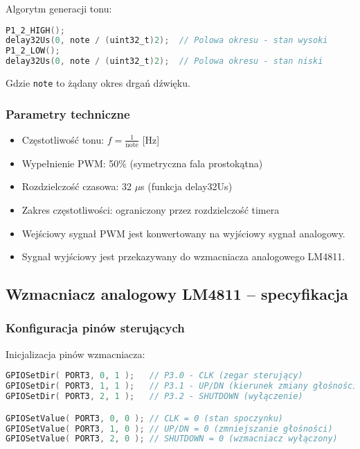 \documentclass[a4paper,12pt]{report}
\begin{document}
Algorytm generacji tonu:

\begin{lstlisting}[language=C]
P1_2_HIGH();
delay32Us(0, note / (uint32_t)2);  // Polowa okresu - stan wysoki
P1_2_LOW();
delay32Us(0, note / (uint32_t)2);  // Polowa okresu - stan niski
\end{lstlisting}

Gdzie \texttt{note} to żądany okres drgań dźwięku.

\subsubsection{Parametry techniczne}

\begin{itemize}
    \item Częstotliwość tonu: $f = \frac{1}{\text{note}}$ [Hz]
    \item Wypełnienie PWM: 50\% (symetryczna fala prostokątna)
    \item Rozdzielczość czasowa: 32 $\mu$s (funkcja delay32Us)
    \item Zakres częstotliwości: ograniczony przez rozdzielczość timera
\end{itemize}

\begin{itemize}
    \item Wejściowy sygnał PWM jest konwertowany na wyjściowy sygnał analogowy.
    \item Sygnał wyjściowy jest przekazywany do wzmacniacza analogowego LM4811.
\end{itemize}

\subsection{Wzmacniacz analogowy LM4811 -- specyfikacja}

\subsubsection{Konfiguracja pinów sterujących}

Inicjalizacja pinów wzmacniacza:
\begin{lstlisting}[language=C]
GPIOSetDir( PORT3, 0, 1 );   // P3.0 - CLK (zegar sterujący)
GPIOSetDir( PORT3, 1, 1 );   // P3.1 - UP/DN (kierunek zmiany głośności)
GPIOSetDir( PORT3, 2, 1 );   // P3.2 - SHUTDOWN (wyłączenie)

GPIOSetValue( PORT3, 0, 0 ); // CLK = 0 (stan spoczynku)
GPIOSetValue( PORT3, 1, 0 ); // UP/DN = 0 (zmniejszanie głośności)
GPIOSetValue( PORT3, 2, 0 ); // SHUTDOWN = 0 (wzmacniacz wyłączony)
\end{lstlisting}
\end{document}
